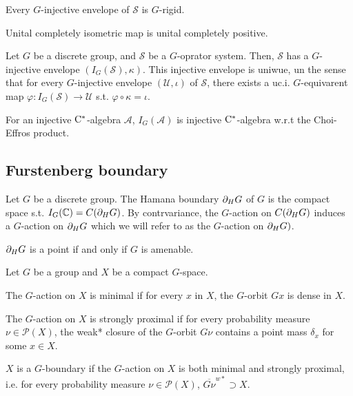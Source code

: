 \begin{remark}
  \cite{hamana1979injective}
  Every $G$-injective envelope of $\mathcal{S}$ is $G$-rigid.
\end{remark}

\begin{remark}
  Unital completely isometric map is unital completely positive.
\end{remark}

\begin{theorem}
  [Hamana]
  Let $G$ be a  discrete group, and $\mathcal{S}$ be a $G$-oprator system.
  Then, $\mathcal{S}$ has a $G$-injective envelope $(I_G(\mathcal{S}),\kappa)$.
  This injective envelope is uniwue, un the sense that for every $G$-injective envelope $(\mathcal{U},\iota)$ of $\mathcal{S}$, there exists a uc.i. $G$-equivarent map $\varphi : I_G(\mathcal{S}) \rightarrow \mathcal{U}$ s.t. $\varphi \circ \kappa = \iota$. 
\end{theorem}

For an injective $\rm{C}^*$-algebra $\mathcal{A}$, $I_G(\mathcal{A})$ is injective $\rm{C}^*$-algebra w.r.t the Choi-Effros product.

\subsection{Furstenberg boundary}
\begin{definition}
  Let $G$ be a discrete group.
  The Hamana boundary $\frak{\partial}_H G$ of $G$ is the compact space s.t. $I_G(\mathbb{C}) = C(\frak{\partial}_H G)$.
  By contrvariance, the $G$-action on $C(\frak{\partial}_H G)$ induces a $G$-action on $\frak{\partial}_H G$ which we will refer to as the $G$-action on $\frak{\partial}_H G)$.
\end{definition}

\begin{theorem}
  $\frak{\partial}_H G$ is a point if and only if $G$ is amenable.
\end{theorem}

\begin{definition}
  Let $G$ be a group and $X$ be a compact $G$-space.

  The $G$-action on $X$ is minimal if for every $x$ in $X$,
  the $G$-orbit $Gx$ is dense in $X$.

  The $G$-action on $X$ is strongly proximal if for every probability measure $\nu \in \mathcal{P}(X)$,
  the weak* closure of the $G$-orbit $G\nu$ contains a point mass $\delta_x$ for some $x \in X$.

  $X$ is a $G$-boundary if the $G$-action on $X$ is both minimal and strongly proximal,
  i.e. for every probability measure $\nu \in \mathcal{P}(X)$,
 $\overline{G\nu}^{w*} \supset X$.
\end{definition}


